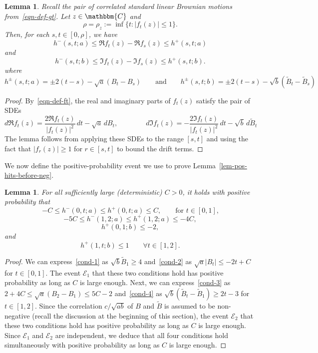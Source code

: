 \documentclass[11pt]{article}
\theoremstyle{plain}
\newtheorem{lem}[thm]{Lemma}
\theoremstyle{definition}
\numberwithin{equation}{section}
\newcommand{\eqb}{\begin{equation}}
\newcommand{\eqe}{\end{equation}}
\newcommand{\eqbn}{\begin{equation*}}
\newcommand{\eqen}{\end{equation*}}
\newcommand{\BB}{\mathbbm}
\newcommand{\wt}{\widetilde}
\newcommand{\mcl}{\mathcal}
\begin{document}
\begin{lem}
Recall the pair of correlated standard linear Brownian motions from~\eqref{eqn-def-gt}. 
Let $z \in \BB{C}$ and 
\eqbn
\rho = \rho_z:= \inf\{t:|f_t(z)| \leq 1\} . 
\eqen
Then, for each $s,t \in [0,\rho]$, we have 
\eqb
\label{eqn-re-ft}
h^-(s,t;a) \leq \Re f_t(z) - \Re f_s(z) \leq h^+(s,t;a)
\eqe 
and
\eqb 
\label{eqn-im-ft}
h^-(s,t;b) \leq \Im f_t(z)  - \Im f_s(z) \leq h^+(s,t;b).
\eqe
where
\[
h^\pm(s,t;a) = \pm 2(t-s) - \sqrt{a} (B_t-B_s) \qquad \text{and} \qquad h^\pm(s,t;b) = \pm 2(t-s) - \sqrt{b} (\wt B_t- \wt B_s)
\]
\end{lem}

\begin{proof}
By~\eqref{eqn-def-ft}, the real and imaginary parts of $f_t(z)$ satisfy the pair of SDEs
\eqb
\label{eqn-re-im-ft}
d\Re f_t(z) = \frac{2 \Re f_t(z)}{|f_t(z)|^2} \, dt - \sqrt{a} \, dB_t, \qquad  \qquad
d\Im f_t(z) = -\frac{2 \Im f_t(z)}{|f_t(z)|^2} \, dt - \sqrt{b} \, d\wt B_t
\eqe
The lemma follows from applying these SDEs to the range $[s,t]$ and using the fact that $|f_r(z)| \geq 1$ for $r \in [s,t]$ to bound the drift terms.
\end{proof}

We now define the positive-probability event we use to prove Lemma~\ref{lem-pos-hits-before-neg}.


\begin{lem}
For all sufficiently large (deterministic) $C>0$, it holds with positive probability that 
\eqb
\label{cond-2}
-C \leq h^-(0,t;a) \leq h^+(0,t;a) \leq C,
\qquad \text{for $t \in [0,1]$,}
\eqe
\eqb
\label{cond-3}
-5C \leq h^-(1,2;a) \leq h^+(1,2;a) \leq -4C,
\eqe
\eqb
\label{cond-1}
h^+(0,1;b) \leq -2,
\eqe
and 
\eqb
\label{cond-4}
h^+(1,t;b) \leq 1 \qquad \forall  t \in [1,2] . 
\eqe
\label{lem-c-event}
\end{lem}

\begin{proof}
We can express~\eqref{cond-1} as $\sqrt{b} \wt B_1 \geq 4$ and~\eqref{cond-2} as $\sqrt{a} |B_t| \leq -2t+C$ for $t \in [0,1]$.  The event $\mcl E_1$ that these two conditions hold has positive probability as long as $C$ is large enough.  Next, 
we can express~\eqref{cond-3} as $2 + 4C \leq \sqrt{a} (B_2-B_1) \leq 5C - 2$ and~\eqref{cond-4} as $\sqrt{b} (\wt B_t- \wt B_1) \geq 2t-3$ for $t \in [1,2]$. Since the correlation $c/\sqrt{ab}$ of $B$ and $\wt B$ is assumed to be non-negative (recall the discussion at the beginning of this section), the event $\mcl E_2$ that these two conditions hold has positive probability as long as $C$ is large enough. Since $\mcl E_1$ and $\mcl E_2$ are independent, we deduce that all four conditions hold simultaneously with positive probability as long as $C$ is large enough.
\end{proof}
\end{document}
